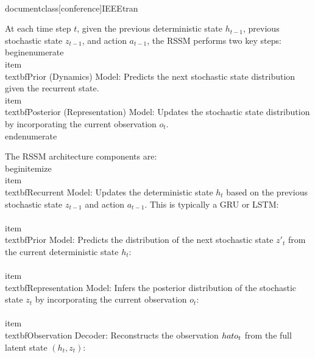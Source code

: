 \\documentclass[conference]{IEEEtran}
\begin{document}
At each time step \( t \), given the previous deterministic state \( h_{t-1} \), previous stochastic state \( z_{t-1} \), and action \( a_{t-1} \), the RSSM performs two key steps:
\\begin{enumerate}
    \\item \\textbf{Prior (Dynamics) Model}: Predicts the next stochastic state distribution given the recurrent state.
    \\item \\textbf{Posterior (Representation) Model}: Updates the stochastic state distribution by incorporating the current observation \( o_t \).
\\end{enumerate}

The RSSM architecture components are:
\\begin{itemize}
    \\item \\textbf{Recurrent Model}: Updates the deterministic state \( h_t \) based on the previous stochastic state \( z_{t-1} \) and action \( a_{t-1} \). This is typically a GRU or LSTM:
    \\[ h_t = f_{recurrent}(h_{t-1}, z_{t-1}, a_{t-1}) \\]
    \\item \\textbf{Prior Model}: Predicts the distribution of the next stochastic state \( z'_t \) from the current deterministic state \( h_t \):
    \\[ q_{\text{prior}}(z'_t | h_t) = \\mathcal{N}(\\mu'_{t}, (\\sigma'_{t})^2) \\]
    \\item \\textbf{Representation Model}: Infers the posterior distribution of the stochastic state \( z_t \) by incorporating the current observation \( o_t \):
    \\[ q_{\text{posterior}}(z_t | h_t, o_t) = \\mathcal{N}(\\mu_t, \\sigma_t^2) \\]
    \\item \\textbf{Observation Decoder}: Reconstructs the observation \( \\hat{o}_t \) from the full latent state \( (h_t, z_t) \):
    \\[ \\hat{o}_t = p_{\theta}(o_t | h_t, z_t) \\]
\end{document}
